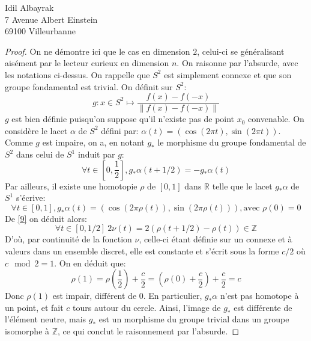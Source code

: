 \documentclass[french]{mpbmail}
\begin{document}
\begin{letter}{%
        Idil Albayrak\\
        7 Avenue Albert Einstein\\
        69100 Villeurbanne
        }
        \begin{proof}
            On ne démontre ici que le cas en dimension $2$, celui-ci se généralisant aisément par le lecteur curieux en dimension $n$. On raisonne par l'absurde, avec les notations ci-dessus.
            On rappelle que $S^{2}$ est simplement connexe et que son groupe fondamental est trivial.
            On définit sur $S^{2}$: 
            \[g: x \in S^{2} \mapsto \frac{f(x)-f(-x)}{\left\lVert f(x) - f(-x)\right\rVert}\]
            $g$ est bien définie puisqu'on suppose qu'il n'existe pas de point $x_{0}$ convenable. On considère le lacet $\alpha$ de $S^{2}$ défini par: $\alpha(t) = (\cos{(2\pi t)}, \sin{(2\pi t)})$.
            Comme $g$ est impaire, on a, en notant $g_{*}$ le morphisme du groupe fondamental de $S^{2}$ dans celui de $S^{1}$ induit par $g$:
            \begin{equation}
                \label{9}
                \forall t \in \left[0, \frac{1}{2}\right], g_{*}\alpha(t + 1/2) = -g_{*}\alpha(t)
            \end{equation}
            Par ailleurs, il existe une homotopie $\rho$ de $\left[0, 1\right]$ dans $\mathbb{R}$ telle que le lacet $g_{*}\alpha$ de $S^{1}$ s'écrive:
            \begin{equation*}
                \forall t \in \left[0, 1\right], g_{*}\alpha(t) = (\cos{(2\pi \rho(t))}, \sin{(2\pi \rho(t))}), \text{avec } \rho(0) = 0
            \end{equation*}
            De \eqref{9} on déduit alors: 
            \begin{equation*}
                \forall t \in \left[0, 1/2\right] \ 2\nu(t) = 2(\rho(t + 1/2) - \rho(t)) \in \mathbb{Z}
            \end{equation*}
            D'où, par continuité de la fonction $\nu$, celle-ci étant définie sur un connexe et à valeurs dans un ensemble discret, elle est constante et s'écrit sous la forme $c/2$ où $c\mod 2 = 1$. On en déduit que: 
            \begin{equation*}
                \rho(1) = \rho \left(\frac{1}{2} \right) + \frac{c}{2} = \left(\rho(0) + \frac{c}{2} \right) + \frac{c}{2} = c
            \end{equation*}
            Donc $\rho(1)$ est impair, différent de $0$. En particulier, $g_{*}\alpha$ n'est pas homotope à un point, et fait $c$ tours autour du cercle. Ainsi, l'image de $g_{*}$ est différente de l'élément neutre, mais $g_{*}$ est un morphisme du groupe trivial dans un groupe isomorphe à $\mathbb{Z}$, ce qui conclut le raisonnement par l'absurde.
        \end{proof}
        

\end{letter}
\end{document}
